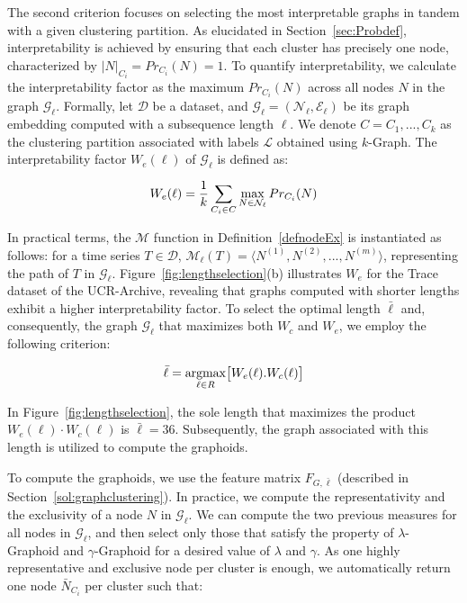  The second criterion focuses on selecting the most interpretable graphs in tandem with a given clustering partition. 
As elucidated in Section~\ref{sec:Probdef}, interpretability is achieved by ensuring that each cluster has precisely one node, characterized by $|N|_{C_i}=Pr_{C_i}(N) = 1$. 
To quantify interpretability, we calculate the interpretability factor as the maximum $Pr_{C_i}(N)$ across all nodes $N$ in the graph $\mathcal{G}_\ell$.
Formally, let $\mathcal{D}$ be a dataset, and $\mathcal{G}_\ell=(\mathcal{N}_\ell,\mathcal{E}_\ell)$ be its graph embedding computed with a subsequence length $\ell$. 
We denote $C={C_1,...,C_k}$ as the clustering partition associated with labels $\mathcal{L}$ obtained using $k$-Graph. The interpretability factor $W_e(\ell)$ of $\mathcal{G}_\ell$ is defined as:

\begin{equation}
\small{
    W_e(\ell) = \frac{1}{k} \sum_{C_i \in C} \max_{N \in \mathcal{N}_\ell} Pr_{C_i}(N)
}
\end{equation}

In practical terms, the $\mathcal{M}$ function in Definition~\ref{defnodeEx} is instantiated as follows: for a time series $T \in \mathcal{D}$, $\mathcal{M}_\ell(T) = \langle N^{(1)},N^{(2)},...,N^{(m)} \rangle$, representing the path of $T$ in $\mathcal{G}_\ell$. 
Figure~\ref{fig:lengthselection}(b) illustrates $W_e$ for the Trace dataset of the UCR-Archive, revealing that graphs computed with shorter lengths exhibit a higher interpretability factor.
To select the optimal length $\bar{\ell}$ and, consequently, the graph $\mathcal{G}_\ell$ that maximizes both $W_c$ and $W_e$, we employ the following criterion:

\begin{equation}
\small{
    \bar{\ell} = \underset{\ell \in R}{\operatorname{argmax}} \big[W_e(\ell).W_c(\ell)\big]
    }
\end{equation}

In Figure~\ref{fig:lengthselection}, the sole length that maximizes the product $W_e(\ell) \cdot W_c(\ell)$ is $\bar{\ell}=36$. Subsequently, the graph associated with this length is utilized to compute the graphoids.

To compute the graphoids, we use the feature matrix $F_{G,\bar{\ell}}$ (described in Section~\ref{sol:graphclustering}). In practice, we compute the representativity and the exclusivity of a node $N$ in $\mathcal{G}_\ell$. We can compute the two previous measures for all nodes in $\mathcal{G}_\ell$, and then select only those that satisfy the property of $\lambda$-Graphoid and $\gamma$-Graphoid for a desired value of $\lambda$ and $\gamma$. As one highly representative and exclusive node per cluster is enough, we automatically return one node $\bar{N}_{C_i}$ per cluster such that:

